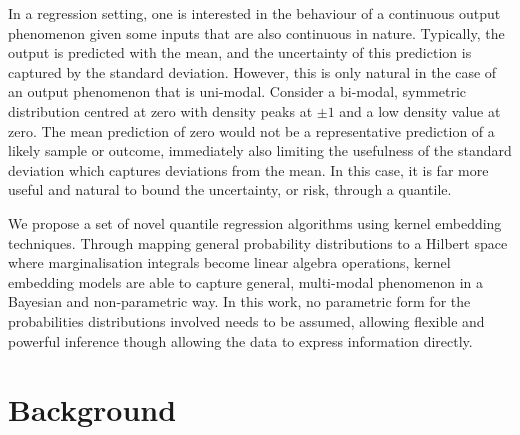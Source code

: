 \documentclass[twoside]{article} \usepackage{aistats2017}
\theoremstyle{definition}
\theoremstyle{theorem}
\begin{document}
	In a regression setting, one is interested in the behaviour of a continuous output phenomenon given some inputs that are also continuous in nature. Typically, the output is predicted with the mean, and the uncertainty of this prediction is captured by the standard deviation. However, this is only natural in the case of an output phenomenon that is uni-modal. Consider a bi-modal, symmetric distribution centred at zero with density peaks at $\pm1$ and a low density value at zero. The mean prediction of zero would not be a representative prediction of a likely sample or outcome, immediately also limiting the usefulness of the standard deviation which captures deviations from the mean. In this case, it is far more useful and natural to bound the uncertainty, or risk, through a quantile.
%
%
	
	We propose a set of novel quantile regression algorithms using kernel embedding techniques. Through mapping general probability distributions to a Hilbert space where marginalisation integrals become linear algebra operations, kernel embedding models are able to capture general, multi-modal phenomenon in a Bayesian and non-parametric way. In this work, no parametric form for the probabilities distributions involved needs to be assumed, allowing flexible and powerful inference though allowing the data to express information directly.
% 
% 

	
\newpage
\section{Background}
\label{sec:background}
	
\end{document}
